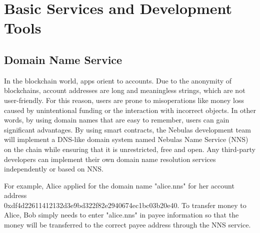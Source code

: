\section{Basic Services and Development Tools}
\label{sec:tools}

\subsection{Domain Name Service}

In the blockchain world, apps orient to accounts. Due to the anonymity of blockchains, account addresses are long and meaningless strings, which are not user-friendly. For this reason, users are prone to misoperations like money loss caused by unintentional funding or the interaction with incorrect objects. In other words, by using domain names that are easy to remember, users can gain significant advantages. By using smart contracts, the Nebulas development team will implement a DNS-like domain system named Nebulas Name Service (NNS) on the chain while ensuring that it is unrestricted, free and open. Any third-party developers can implement their own domain name resolution services independently or based on NNS.


For example, Alice applied for the domain name "alice.nns" for her account address \\0xdf4d22611412132d3e9bd322f82e2940674ec1bc03b20e40. To transfer money to Alice, Bob simply needs to enter "alice.nns" in payee information so that the money will be transferred to the correct payee address through the NNS service.


